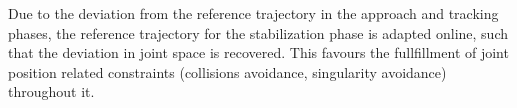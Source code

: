 Due to the deviation from the reference trajectory in the approach and tracking phases, the reference trajectory for the stabilization phase is adapted online, such that the deviation in joint space is recovered. This favours the fullfillment of joint position related constraints (collisions avoidance, singularity avoidance) throughout it. 
%
%
%
%
%
